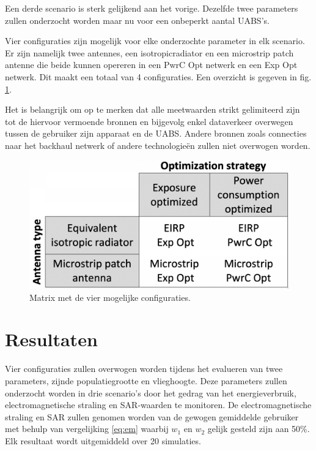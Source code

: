 \documentclass[twocolumn]{phdsymp_dutch}
\begin{document}
Een derde scenario is sterk gelijkend aan het vorige. Dezelfde twee parameters zullen onderzocht 
worden maar nu voor een onbeperkt aantal \gls{UABS}'s.

Vier configuraties zijn mogelijk voor elke onderzochte parameter in elk scenario.
Er zijn namelijk twee antennes, een \gls{isotropicradiator} en een microstrip patch antenne die
beide kunnen opereren in een \gls{PwrC Opt} netwerk en een \gls{Exp Opt} netwerk. Dit maakt een totaal van 4 configuraties.
Een overzicht is gegeven in fig. \ref{fig:fourCasesMatrix}.

Het is belangrijk om op te merken dat alle meetwaarden strikt gelimiteerd zijn tot de hiervoor vermoende bronnen en 
bijgevolg enkel dataverkeer overwegen tussen de gebruiker zijn apparaat en de \gls{UABS}. 
Andere bronnen zoals connecties naar het backhaul netwerk of andere technologie\"en zullen niet overwogen worden.

\begin{figure}[h!]
\centering
  \includegraphics[width=0.9\linewidth]{fourCasesMatrix.png}
  \caption{Matrix met de vier mogelijke configuraties.}
  \label{fig:fourCasesMatrix}
\end{figure}

\section{Resultaten}
Vier configuraties zullen overwogen worden tijdens het evalueren van twee parameters, zijnde 
populatiegrootte en vlieghoogte. Deze parameters zullen onderzocht worden in drie scenario's 
door het gedrag van het energieverbruik, electromagnetische straling en \gls{SAR}-waarden te monitoren.
De electromagnetische straling en \gls{SAR} zullen genomen worden van de gewogen gemiddelde gebruiker
met behulp van vergelijking \ref{eq:em} waarbij $w_{1}$ en $w_{2}$ gelijk gesteld zijn aan 50\%. 
Elk resultaat wordt uitgemiddeld over 20 simulaties.
\end{document}
